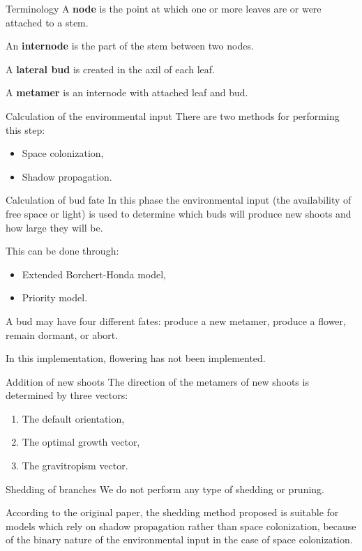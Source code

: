 \documentclass{beamer}
\begin{document}
\begin{frame}{Terminology}
A \textbf{node} is the point at which one or more leaves are or were attached to a stem.

An \textbf{internode} is the part of the stem between two nodes.

A \textbf{lateral bud} is created in the axil of each leaf.

A \textbf{metamer} is an internode with attached leaf and bud.
\end{frame}


\begin{frame}{Calculation of the environmental input}
There are two methods for performing this step:
\begin{itemize}
\item Space colonization,
\item Shadow propagation.
\end{itemize}
\end{frame}


\begin{frame}{Calculation of bud fate}
In this phase the environmental input (the availability of free space or light) is used to determine which buds will produce new shoots and how large they will be.

This can be done through:

\begin{itemize}
\item Extended Borchert-Honda model,
\item Priority model.
\end{itemize}

A bud may have four different fates: produce a new metamer, produce a flower, remain dormant, or abort.

In this implementation, flowering has not been implemented.
\end{frame}


\begin{frame}{Addition of new shoots}
The direction of the metamers of new shoots is determined by three vectors:

\begin{enumerate}
\item The default orientation,
\item The optimal growth vector,
\item The gravitropism vector.
\end{enumerate}
\end{frame}


\begin{frame}{Shedding of branches}
We do not perform any type of shedding or pruning.

According to the original paper, the shedding method proposed is suitable for models which rely on shadow propagation rather than space colonization, because of the binary nature of the environmental input in the case of space colonization.
\end{frame}
\end{document}
